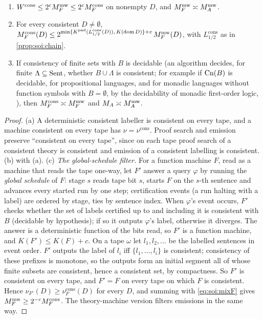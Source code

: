 \begin{proposition}\label{prop:soi:pathwise}
\begin{enumerate}[label=(\alph*),leftmargin=*]
\item $W^{\mathrm{cons}}\le2^cM_{F}^{\mathrm{mw}}\le2^cM_{F}^{\mathrm{cons}}$ on nonempty $D$, and $M_{F}^{\mathrm{mw}}\asymp M_A^{\mathrm{mw}}$.
\item For every consistent $D\ne\emptyset$, $M_{F}^{\mathrm{cons}}(D)\le2^{\min\{K^{\mathrm{pad}}(L^{\mathrm{cons}}_{1/2}(D)),\,K(\operatorname{dom} D)\}+c}\,M_{F}^{\mathrm{mw}}(D)$, with $L^{\mathrm{cons}}_{1/2}$ as in \cref{prop:soi:chain}.
\item If consistency of finite sets with $B$ is decidable (an algorithm decides, for finite $\Lambda\subseteq\mathrm{Sent}$, whether $B\cup\Lambda$ is consistent; for example if $\mathrm{Cn}(B)$ is decidable, for propositional languages, and for monadic languages without function symbols with $B=\emptyset$, by the decidability of monadic first-order logic, \citealp{lowenheim1915moglichkeiten,behmann1922beitrage}), then $M_{F}^{\mathrm{cons}}\asymp M_{F}^{\mathrm{mw}}$ and $M_{A}\asymp M_A^{\mathrm{mw}}$.
\end{enumerate}
\end{proposition}

\begin{proof}
(a) A deterministic consistent labeller is consistent on every tape, and a machine consistent on every tape has $\nu=\nu^{\mathrm{cons}}$. Proof search and emission preserve ``consistent on every tape'', since on each tape proof search of a consistent theory is consistent and emission of a consistent labelling is consistent. (b)  with (a). (c) \emph{The global-schedule filter.} For a function machine $F$, read as a machine that reads the tape one-way, let $F'$ answer a query $\varphi$ by running the \emph{global schedule} of $F$: stage $s$ reads tape bit $s$, starts $F$ on the $s$-th sentence and advances every started run by one step; certification events (a run halting with a label) are ordered by stage, ties by sentence index. When $\varphi$'s event occurs, $F'$ checks whether the set of labels certified up to and including it is consistent with $B$ (decidable by hypothesis); if so it outputs $\varphi$'s label, otherwise it diverges. The answer is a deterministic function of the bits read, so $F'$ is a function machine, and $K(F')\le K(F)+c$. On a tape $\omega$ let $l_1,l_2,\dots$ be the labelled sentences in event order. $F'$ outputs the label of $l_i$ iff $\{l_1,\dots,l_i\}$ is consistent; consistency of these prefixes is monotone, so the outputs form an initial segment all of whose finite subsets are consistent, hence a consistent set, by compactness. So $F'$ is consistent on every tape, and $F'=F$ on every tape on which $F$ is consistent. Hence $\nu_{F'}(D)\ge\nu^{\mathrm{cons}}_F(D)$ for every $D$, and summing with \eqref{eq:soi:mixF} gives $M_{F}^{\mathrm{mw}}\ge2^{-c}M_{F}^{\mathrm{cons}}$. The theory-machine version filters emissions in the same way.
\end{proof}

